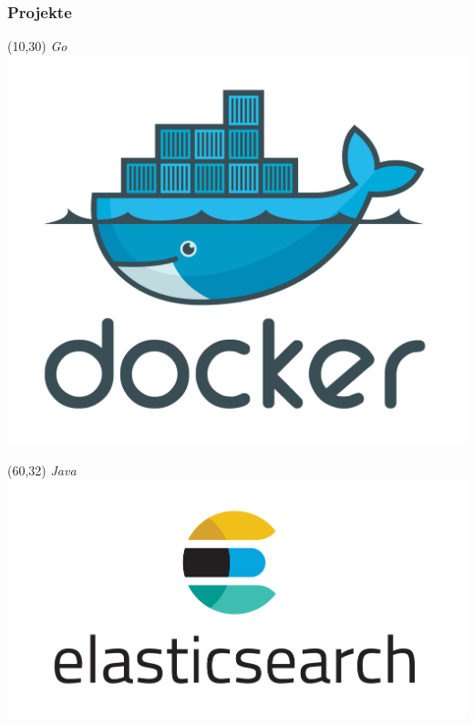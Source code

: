 \documentclass{beamer}
\begin{document}
\begin{frame}

\frametitle{Projekte}

\begin{textblock}{20}(10,30)
\textit{Go}
\includegraphics[scale=0.22]{docker.png}
\end{textblock}

\begin{textblock}{20}(60,32)
\textit{Java}
\includegraphics[scale=0.22]{elasticsearch.png}
\end{textblock}

\end{frame}
\end{document}
